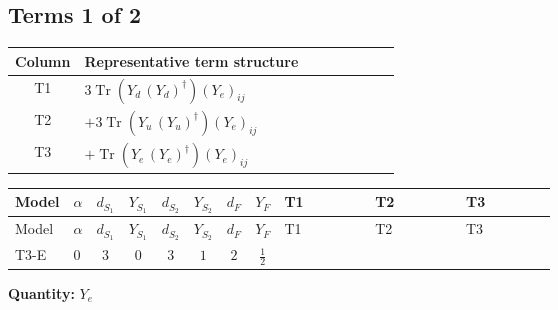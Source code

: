 \documentclass[8pt]{article}
\begin{document}
\begin{landscape}
\subsection*{Terms 1 of 2}
\begin{center}
\begin{tabular}{@{}c >{\raggedright\arraybackslash}p{0.82\linewidth}@{}}
\toprule
Column & Representative term structure \\
\midrule
T1 & \(\displaystyle 3 \operatorname{Tr}\!\left({Y_d}\,\left({Y_d}\right)^{\dagger}\right) \left({Y_e}\right)_{ij}\) \\
\midrule
T2 & \(\displaystyle +3 \operatorname{Tr}\!\left({Y_u}\,\left({Y_u}\right)^{\dagger}\right) \left({Y_e}\right)_{ij}\) \\
\midrule
T3 & \(\displaystyle +\operatorname{Tr}\!\left({Y_e}\,\left({Y_e}\right)^{\dagger}\right) \left({Y_e}\right)_{ij}\) \\
\midrule
\bottomrule
\end{tabular}
\end{center}
\smallskip
\tiny
\begin{longtable}{@{}llcccccc >{\raggedright\arraybackslash}p{0.21\linewidth} >{\raggedright\arraybackslash}p{0.21\linewidth} >{\raggedright\arraybackslash}p{0.21\linewidth}@{}}
\toprule
Model & $\alpha$ & $d_{S_1}$ & $Y_{S_1}$ & $d_{S_2}$ & $Y_{S_2}$ & $d_F$ & $Y_F$ & T1 & T2 & T3 \\
\midrule
\endfirsthead
\toprule
Model & $\alpha$ & $d_{S_1}$ & $Y_{S_1}$ & $d_{S_2}$ & $Y_{S_2}$ & $d_F$ & $Y_F$ & T1 & T2 & T3 \\
\midrule
\endhead
T3-E & $0$ & $3$ & $0$ & $3$ & $1$ & $2$ & $\frac{1}{2}$ & \scriptsize\adjustbox{max width=\linewidth}{$\begin{gathered} 3 \operatorname{Tr}\!\left({Y_d}\,\left({Y_d}\right)^{\dagger}\right) \left({Y_e}\right)_{ij}\end{gathered}$} & \scriptsize\adjustbox{max width=\linewidth}{$\begin{gathered} +3 \operatorname{Tr}\!\left({Y_u}\,\left({Y_u}\right)^{\dagger}\right) \left({Y_e}\right)_{ij}\end{gathered}$} & \scriptsize\adjustbox{max width=\linewidth}{$\begin{gathered} +\operatorname{Tr}\!\left({Y_e}\,\left({Y_e}\right)^{\dagger}\right) \left({Y_e}\right)_{ij}\end{gathered}$} \\
\midrule
\bottomrule
\end{longtable}
\clearpage
\noindent\textbf{Quantity: }$Y_e$\par\smallskip

\end{landscape}
\end{document}
